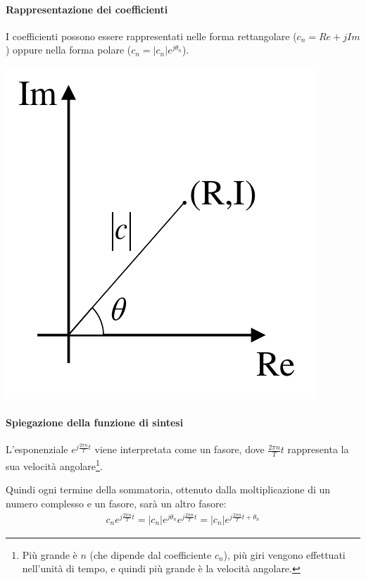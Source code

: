 \documentclass[a4paper, 10pt]{report}
\begin{document}
\paragraph*{Rappresentazione dei coefficienti} I coefficienti possono essere rappresentati nelle forma rettangolare ($c_n = Re + jIm$) oppure nella forma polare ($c_n = |c_n|e^{j\theta_n}$).
\begin{center}
\includegraphics[scale=0.4]{1.pdf}
\end{center}

\paragraph*{Spiegazione della funzione di sintesi} L'esponenziale $e^{j\frac{2 \pi n}{T} t}$ viene interpretata come un fasore, dove $\frac{2 \pi n}{T} t$ rappresenta la sua velocità angolare\footnote{Più grande è $n$ (che dipende dal coefficiente $c_n$), più giri vengono effettuati nell'unità di tempo, e quindi più grande è la velocità angolare.}. 

\noindent Quindi ogni termine della sommatoria, ottenuto dalla moltiplicazione di un numero complesso e un fasore, sarà un altro fasore:
\begin{align*}
c_ne^{j\frac{2 \pi n}{T} t} = |c_n|e^{j\theta_n}e^{j\frac{2 \pi n}{T} t} = |c_n|e^{j\frac{2 \pi n}{T} t + \theta_n}
\end{align*}
\end{document}
